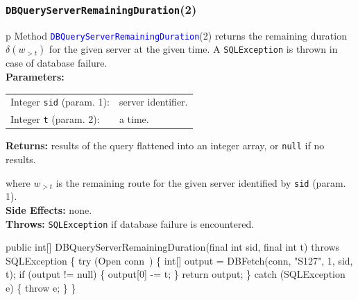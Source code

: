 \documentclass{article}
\def\nwendcode{\endtrivlist \endgroup}      %
\let\nwdocspar=\par
\theoremstyle{definition}                   %
\begin{document}
\subsubsection{{\tt{}\protect{}DBQueryServerRemainingDuration}(2)}
\begin{tabular}{p{\textwidth}}
\toprule
{}
Method \textcolor{blue}{{\tt{}\protect{}DBQueryServerRemainingDuration}}(2) returns the
remaining duration $\delta(w_{>t})$ for the given server at the given time.
A {\tt{}SQLException} is thrown in case of database failure.\\
\midrule
\textbf{Parameters:} \\
\begin{tabular}{lp{116mm}}
Integer {\tt{}sid} (param. 1):&server identifier.\\
Integer {\tt{}t} (param. 2):&a time.\\
\end{tabular}
\textbf{Returns:} results of the query flattened into an integer array,
or {\tt{}null} if no results.


where $w_{>t}$ is the remaining route for the given server identified by {\tt{}sid} (param. 1).\\
\textbf{Side Effects:} none.\\
\textbf{Throws:} {\tt{}SQLException} if database failure is encountered.\\
\bottomrule
\end{tabular}
\nwenddocs{}\endmoddef{}
public int[] DBQueryServerRemainingDuration(final int sid, final int t)
throws SQLException \{
  try (\LA{}Open \code{}conn\edoc{}~{\nwtagstyle{}}\RA{}) \{
    int[] output = DBFetch(conn, "S127", 1, sid, t);
    if (output != null) \{
      output[0] -= t;
    \}
    return output;
  \} catch (SQLException e) \{
    throw e;
  \}
\}
\eatline
{}\nwendcode{}\nwdocspar
\end{document}
